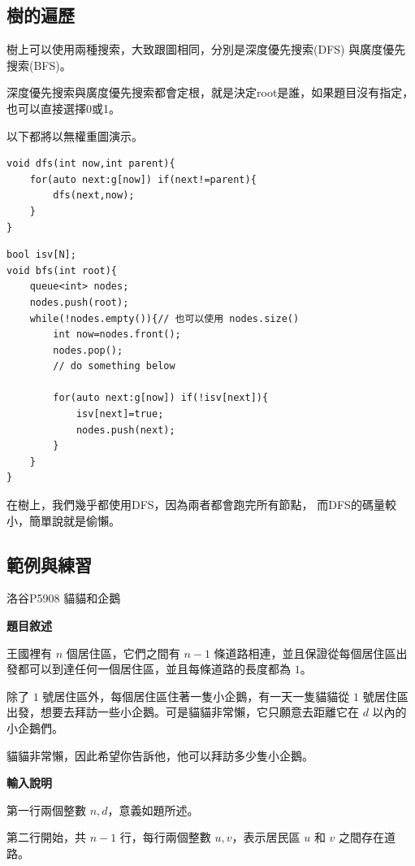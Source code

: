     \subsection{樹的遍歷}
    樹上可以使用兩種搜索，大致跟圖相同，分別是深度優先搜索(DFS)
    與廣度優先搜索(BFS)。

    深度優先搜索與廣度優先搜索都會定根，就是決定root是誰，如果題目沒有指定，
    也可以直接選擇0或1。

    以下都將以無權重圖演示。

\begin{lstlisting}[caption=DFS in Tree]
void dfs(int now,int parent){
    for(auto next:g[now]) if(next!=parent){
        dfs(next,now);
    }
}
\end{lstlisting}

\begin{lstlisting}[caption=BFS in Tree]
bool isv[N];
void bfs(int root){
    queue<int> nodes;
    nodes.push(root);
    while(!nodes.empty()){// 也可以使用 nodes.size()
        int now=nodes.front();
        nodes.pop();
        // do something below

        for(auto next:g[now]) if(!isv[next]){
            isv[next]=true;
            nodes.push(next);
        }
    }
}
\end{lstlisting}

    在樹上，我們幾乎都使用DFS，因為兩者都會跑完所有節點，
    而DFS的碼量較小，簡單說就是偷懶。

    \subsection{範例與練習}

    \example 洛谷P5908 貓貓和企鵝

    \textbf{題目敘述}

    王國裡有 $n$ 個居住區，它們之間有 $n-1$ 條道路相連，並且保證從每個居住區出發都可以到達任何一個居住區，並且每條道路的長度都為 $1$。

    除了 $1$ 號居住區外，每個居住區住著一隻小企鵝，有一天一隻貓貓從 $1$ 號居住區出發，想要去拜訪一些小企鵝。可是貓貓非常懶，它只願意去距離它在 $d$ 以內的小企鵝們。

    貓貓非常懶，因此希望你告訴他，他可以拜訪多少隻小企鵝。

    \textbf{輸入說明}

    第一行兩個整數 $n, d$，意義如題所述。

    第二行開始，共 $n - 1$ 行，每行兩個整數 $u, v$，表示居民區 $u$ 和 $v$ 之間存在道路。
    
